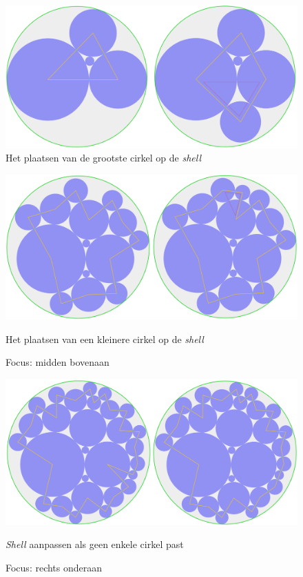 \documentclass[12pt,a4paper,oneside]{book}
\begin{document}
{\begin{figure}
  \centering
  \includegraphics[width=1.0\textwidth]{plaats-op-shell-simpel.png}
  \caption{Het plaatsen van de grootste cirkel op de \textit{shell}} \label{fig:plaats-op-shell-simpel} 
\end{figure}

\begin{figure}
  \centering
  \includegraphics[width=1.0\textwidth]{plaats-op-shell-kleiner.png}
  \caption{Het plaatsen van een kleinere cirkel op de \textit{shell}} \label{fig:plaats-op-shell-kleiner} 
  \caption*{Focus: midden bovenaan}
\end{figure}

\begin{figure}
  \centering
  \includegraphics[width=1.0\textwidth]{plaats-op-shell-geen-enkele-past.png}
  \caption{\textit{Shell} aanpassen als geen enkele cirkel past} \label{fig:plaats-op-shell-geen-enkele-past} 
  \caption*{Focus: rechts onderaan}
\end{figure}

}
\end{document}

